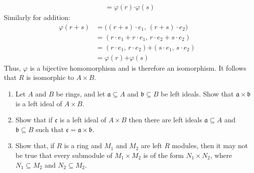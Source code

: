 \documentclass[crop=false,class=article]{standalone}                       %
\begin{document}
\begin{solution}
\begin{subequations}
\begin{align}
                    &=\varphi(r)\boldsymbol{\cdot}\varphi(s)
                \end{align}
            \end{subequations}
            Similarly for addition:
            \begin{subequations}
                \begin{align}
                    \varphi(r+s)
                    &=\big((r+s)\cdot{e}_{1},\,
                           (r+s)\cdot{e}_{2}\big)\\
                    &=(r\cdot{e}_{1}+r\cdot{e}_{1},\,
                       r\cdot{e}_{2}+s\cdot{e}_{2})\\
                    &=(r\cdot{e}_{1},\,r\cdot{e}_{2})\boldsymbol{+}
                      (s\cdot{e}_{1},\,s\cdot{e}_{2})\\
                    &=\varphi(r)\boldsymbol{+}\varphi(s)
                \end{align}
            \end{subequations}
            Thus, $\varphi$ is a bijective homomorphism and is therefore
            an isomorphism. It follows that $R$ is isomorphic to
            $A\times{B}$.
        \end{solution}
        \begin{problem}
            \par\hfill\par
            \begin{enumerate}
                \item   Let $A$ and $B$ be rings, and let
                        $\mathfrak{a}\subseteq{A}$ and
                        $\mathfrak{b}\subseteq{B}$ be left ideals.
                        Show that $\mathfrak{a}\times\mathfrak{b}$ is a
                        left ideal of $A\times{B}$.
                \item   Show that if $\mathfrak{c}$ is a left ideal of
                        $A\times{B}$ then there are left ideals
                        $\mathfrak{a}\subseteq{A}$ and
                        $\mathfrak{b}\subseteq{B}$ such that
                        $\mathfrak{c}=\mathfrak{a}\times\mathfrak{b}$.
                \item   Show that, if $R$ is a ring and $M_{1}$ and $M_{2}$
                        are left $R$ modules, then it may not be true that
                        every submodule of $M_{1}\times{M}_{2}$ is of the
                        form $N_{1}\times{N}_{2}$, where
                        $N_{1}\subseteq{M}_{2}$ and $N_{2}\subseteq{M}_{2}$.
            \end{enumerate}
        \end{problem}
\end{document}
